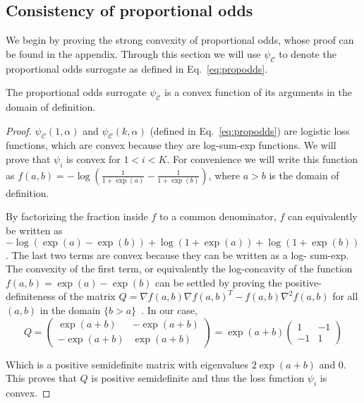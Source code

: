 \subsection{Consistency of proportional odds}\label{subsec:propodds}

We begin by proving the strong convexity of proportional odds, whose proof can be found in the appendix. Through this section we will use $\psi_{\mathcal{C}}$ to denote the proportional odds surrogate as defined in Eq.~\eqref{eq:propodds}.

\begin{lemma}\label{thm:convex}
The proportional odds surrogate $\psi_{\mathcal{C}}$ is a convex function of its arguments in the domain of definition.
\end{lemma}

\begin{proof}
$\psi_{\mathcal{C}}(1, \alpha)$ and $\psi_{\mathcal{C}}(k, \alpha)$ (defined in Eq.~\eqref{eq:propodds}) are logistic loss functions, which are convex because they are log-sum-exp functions. We
will prove that $\psi_i$ is convex for $1 < i< K$. For convenience we will write this function as $f(a, b) = -\log\left( \frac{1}{1 + \exp{(a)}} -
\frac{1}{1 + \exp{(b)}}\right)$, where $a > b$ is the domain of definition. 

By factorizing the fraction inside $f$ to a common denominator, $f$ can
equivalently be written as $- \log(\exp(a) - \exp(b)) + \log(1 + \exp(a)) +
\log(1 + \exp(b))$. The last two terms are convex because they can be written
as a log- sum-exp. The convexity of the first term, or equivalently the  \mbox{log-concavity} of the function $f(a, b) = {\exp(a) - \exp(b)}$ can be
settled by proving the positive-definiteness of the matrix $Q = \nabla f(a, b)\nabla f(a, b)^T - f(a, b)\nabla^2f(a, b)$ for all $(a, b)$ in the
domain $\{b > a\}$~\citep{boyd2004convex}. In our case,
%
\begin{equation*}
Q = 
\begin{pmatrix}
\exp(a + b) & -\exp(a + b) \\
- \exp(a + b) & \exp(a + b)
\end{pmatrix} = 
\exp(a + b)\begin{pmatrix}
1 & -1 \\
- 1 & 1
\end{pmatrix}
\end{equation*}

Which is a positive semidefinite matrix with eigenvalues $2 \exp(a + b)$ and $0$. This
proves that $Q$ is positive semidefinite and thus the loss function $\psi_i$
is convex.
\end{proof}



